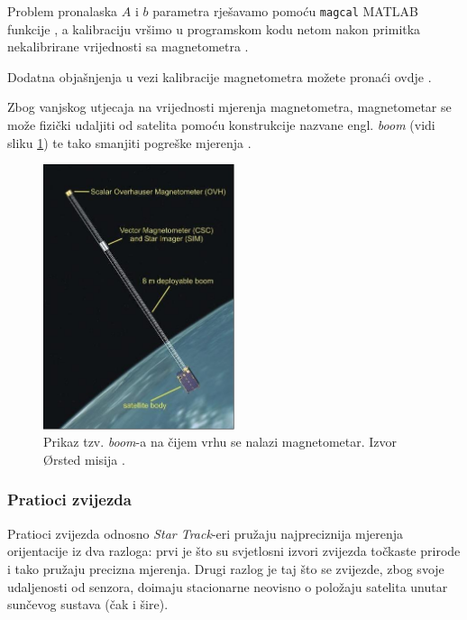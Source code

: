 \documentclass[times, utf8, diplomski, numeric]{templates/template}
\begin{document}
{{{{                Problem pronalaska $A$ i $b$ parametra rješavamo pomoću \texttt{magcal} MATLAB funkcije \cite{magcal}, a kalibraciju vršimo u programskom kodu netom nakon primitka nekalibrirane vrijednosti sa magnetometra \cite{kalibracijaMagKod}.

                Dodatna objašnjenja u vezi kalibracije magnetometra možete pronaći ovdje \cite{kalibracijaMatlabStranica}.

                Zbog vanjskog utjecaja na vrijednosti mjerenja magnetometra, magnetometar se može fizički udaljiti od satelita pomoću konstrukcije nazvane engl. \emph{boom} (vidi sliku \ref{fig:boom}) te tako smanjiti pogreške mjerenja \cite{adcsKnjiga}. 

                \begin{figure}[htb]
                \centering
                \includegraphics[width=0.5\textwidth]{images/boom.jpg}
                \caption{Prikaz tzv. \emph{boom}-a na čijem vrhu se nalazi magnetometar. Izvor Ørsted misija \cite{boomCite}.}
                \label{fig:boom}
                \end{figure}
            }

            \subsubsection{Pratioci zvijezda }{
                Pratioci zvijezda odnosno \emph{Star Track}-eri pružaju najpreciznija mjerenja orijentacije iz dva razloga: prvi je što su svjetlosni izvori zvijezda točkaste prirode i tako pružaju precizna mjerenja. Drugi razlog je taj što se zvijezde, zbog svoje udaljenosti od senzora, doimaju stacionarne neovisno o položaju satelita unutar sunčevog sustava (čak i šire).

}}}}
\end{document}
